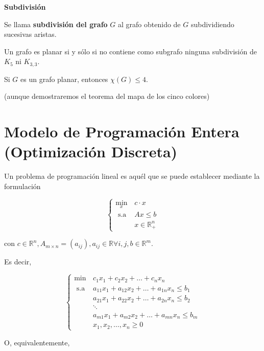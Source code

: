 \documentclass[openany]{book}
\begin{document}
\begin{definition}{ \color{turquoise} \textbf{Subdivisión}}

  Se llama \textbf{subdivisión del grafo} $G$ al grafo obtenido de $G$ subdividiendo sucesivas aristas.
\end{definition}

\begin{theorem}
  Un grafo es planar si y sólo si no contiene como subgrafo ninguna subdivisión de $K_{5}$ ni $K_{3,3}$.

\end{theorem}

\begin{theorem}
  Si $G$ es un grafo planar, entonces $\chi(G) \leq 4$.

  (aunque demostraremos el teorema del mapa de los cinco colores)

\end{theorem}

\chapter{Modelo de Programación Entera (Optimización Discreta)}


Un problema de programación lineal es aquél que se puede establecer mediante la formulación

$$
\begin{cases}\min _{x} & c \cdot x \\ \text { s.a } & A x \leq b \\ & x \in \mathbb{R}_{+}^{n}\end{cases}
$$

con $c \in \mathbb{R}^{n}, A_{m \times n}=\left(a_{i j}\right), a_{i j} \in \mathbb{R} \forall i, j, b \in \mathbb{R}^{m}$.

Es decir,

$$
\begin{cases}\min & c_{1} x_{1}+c_{2} x_{2}+\ldots+c_{n} x_{n} \\ \text { s.a } & a_{11} x_{1}+a_{12} x_{2}+\ldots+a_{1 n} x_{n} \leq b_{1} \\ & a_{21} x_{1}+a_{22} x_{2}+\ldots+a_{2 n} x_{n} \leq b_{2} \\ & \ddots \\ \quad & a_{m 1} x_{1}+a_{m 2} x_{2}+\ldots+a_{m n} x_{n} \leq b_{m} \\ & x_{1}, x_{2}, \ldots, x_{n} \geq 0\end{cases}
$$

O, equivalentemente,
\end{document}
